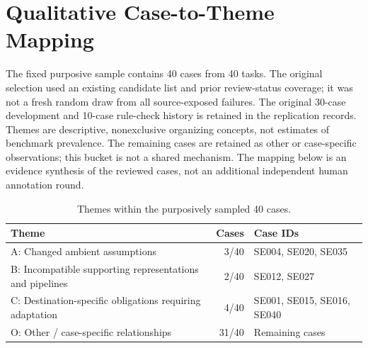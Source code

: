 \section{Qualitative Case-to-Theme Mapping}
\label{sec:qualitative-mapping}
The fixed purposive sample contains 40 cases from 40 tasks. The original selection used an existing candidate list and prior review-status coverage; it was not a fresh random draw from all source-exposed failures. The original 30-case development and 10-case rule-check history is retained in the replication records. Themes are descriptive, nonexclusive organizing concepts, not estimates of benchmark prevalence. The remaining cases are retained as other or case-specific observations; this bucket is not a shared mechanism. The mapping below is an evidence synthesis of the reviewed cases, not an additional independent human annotation round.
\begin{table}[htbp]
\centering\small
\caption{Themes within the purposively sampled 40 cases.}
\label{tab:qualitative-themes}
\begin{tabularx}{\linewidth}{@{}Xrl@{}}\toprule Theme & Cases & Case IDs \\ \midrule
A: Changed ambient assumptions & 3/40 & SE004, SE020, SE035 \\
B: Incompatible supporting representations and pipelines & 2/40 & SE012, SE027 \\
C: Destination-specific obligations requiring adaptation & 4/40 & SE001, SE015, SE016, SE040 \\
O: Other / case-specific relationships & 31/40 & Remaining cases \\
\bottomrule\end{tabularx}\end{table}
\small
